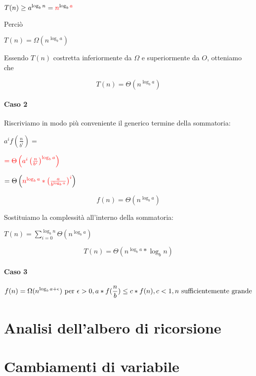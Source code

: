 $T(n) \geq a^{\log_b{n}} = \textcolor{red}{n}^{\log_b{\textcolor{red}{a}}}$

Perciò 

$T(n) = \Omega(n^{\log_b{a}})$

Essendo $T(n)$ costretta inferiormente da $\Omega$ e superiormente da $O$, otteniamo che

\begin{equation}
T(n) = \Theta(n^{\log_b{a}})
\end{equation}

\paragraph{Caso 2}

Riscriviamo in modo più conveniente il generico termine della sommatoria:

$a^if\left(\frac{n}{b^i}\right)=$

$\textcolor{red}{=\Theta\left(a^i\left(\frac{n}{b^i}\right)^{\log_b{a}}\right)}$

$=\Theta\left(\textcolor{red}{n^{\log_b{a}} * \left( \frac{a}{b^{\log_b{a}}} \right)^i} \right)$

\begin{equation}
f(n) = \Theta(n^{\log_b{a}})
\end{equation}

Sostituiamo la complessità all'interno della sommatoria:

$T(n) = \sum_{i=0}^{\log_b{n}}{\Theta(n^{\log_b{a}})}$

\begin{equation}
T(n) = \Theta(n^{\log_b{a}}*\log_b{n})
\end{equation}

\paragraph{Caso 3}

\begin{equation}
f(n) = \Omega(n^{\log_b{a} + \epsilon})  \mbox{ per } \epsilon > 0, \\ 
a*f(\frac{n}{b}) \leq c*f(n), \\ 
c < 1, \\
n \mbox{ sufficientemente grande}
\end{equation}

\section{Analisi dell'albero di ricorsione}


\section{Cambiamenti di variabile}

